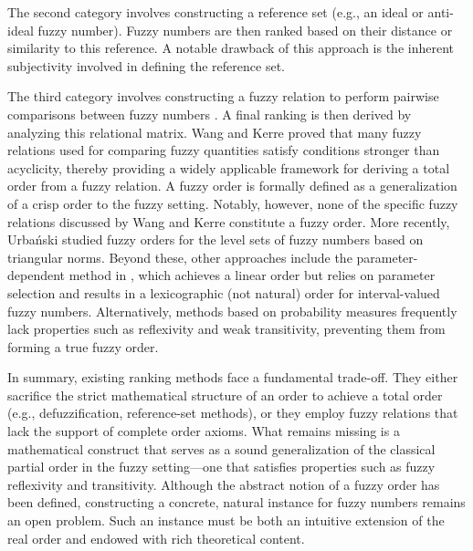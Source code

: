 \documentclass[preprint,3p,times]{elsarticle}
\theoremstyle{plain}
\theoremstyle{definition}
\numberwithin{equation}{section}
\begin{document}
The second category involves constructing a reference set \cite{jain1977procedure,jain1976decision,CHEN1985113} (e.g., an ideal or anti-ideal fuzzy number). Fuzzy numbers are then ranked based on their distance or similarity to this reference. A notable drawback of this approach is the inherent subjectivity involved in defining the reference set.

The third category involves constructing a fuzzy relation to perform pairwise comparisons between fuzzy numbers \cite{wang1997comparative,wang1996classification}. A final ranking is then derived by analyzing this relational matrix. Wang and Kerre \cite{WANG2001387} proved that many fuzzy relations used for comparing fuzzy quantities satisfy conditions stronger than acyclicity, thereby providing a widely applicable framework for deriving a total order from a fuzzy relation. A fuzzy order is formally defined as a generalization of a crisp order to the fuzzy setting. Notably, however, none of the specific fuzzy relations discussed by Wang and Kerre \cite{WANG2001387} constitute a fuzzy order. More recently, Urbański \cite{URBANSKI2024108992} studied fuzzy orders for the level sets of fuzzy numbers based on triangular norms. Beyond these,  other approaches include the parameter-dependent method in \cite{WANG2014131}, which achieves a linear order but relies on parameter selection and results in a lexicographic (not natural) order for interval-valued fuzzy numbers. Alternatively, methods based on probability measures \cite{ZADEH19999,DUBOIS1983183} frequently lack properties such as reflexivity and weak transitivity, preventing them from forming a true fuzzy order.


In summary, existing ranking methods face a fundamental trade-off. They either sacrifice the strict mathematical structure of an order to achieve a total order (e.g., defuzzification, reference-set methods), or they employ fuzzy relations that lack the support of complete order axioms. What remains missing is a mathematical construct that serves as a sound generalization of the classical partial order in the fuzzy setting—one that satisfies properties such as fuzzy reflexivity and transitivity. Although the abstract notion of a fuzzy order has been defined, constructing a concrete, natural instance for fuzzy numbers remains an open problem. Such an instance must be both an intuitive extension of the real order and endowed with rich theoretical content.
\end{document}
